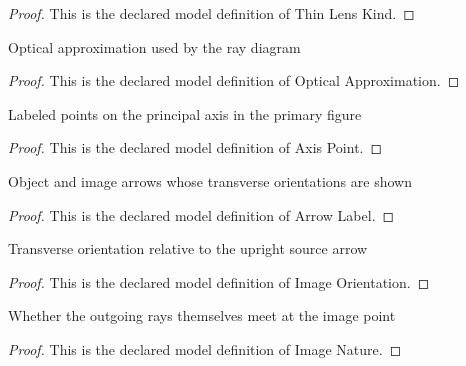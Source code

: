 \begin{proof}
  This is the declared model definition of Thin Lens Kind.
\end{proof}
\begin{definition}
  \label{def:physics:phyx-mini-0134:phyxminiproblems-problemphyxmini0134-opticalapproximation}
  Optical approximation used by the ray diagram
\end{definition}
\begin{proof}
  This is the declared model definition of Optical Approximation.
\end{proof}
\begin{definition}
  \label{def:physics:phyx-mini-0134:phyxminiproblems-problemphyxmini0134-axispoint}
  Labeled points on the principal axis in the primary figure
\end{definition}
\begin{proof}
  This is the declared model definition of Axis Point.
\end{proof}
\begin{definition}
  \label{def:physics:phyx-mini-0134:phyxminiproblems-problemphyxmini0134-arrowlabel}
  Object and image arrows whose transverse orientations are shown
\end{definition}
\begin{proof}
  This is the declared model definition of Arrow Label.
\end{proof}
\begin{definition}
  \label{def:physics:phyx-mini-0134:phyxminiproblems-problemphyxmini0134-imageorientation}
  Transverse orientation relative to the upright source arrow
\end{definition}
\begin{proof}
  This is the declared model definition of Image Orientation.
\end{proof}
\begin{definition}
  \label{def:physics:phyx-mini-0134:phyxminiproblems-problemphyxmini0134-imagenature}
  Whether the outgoing rays themselves meet at the image point
\end{definition}
\begin{proof}
  This is the declared model definition of Image Nature.
\end{proof}
